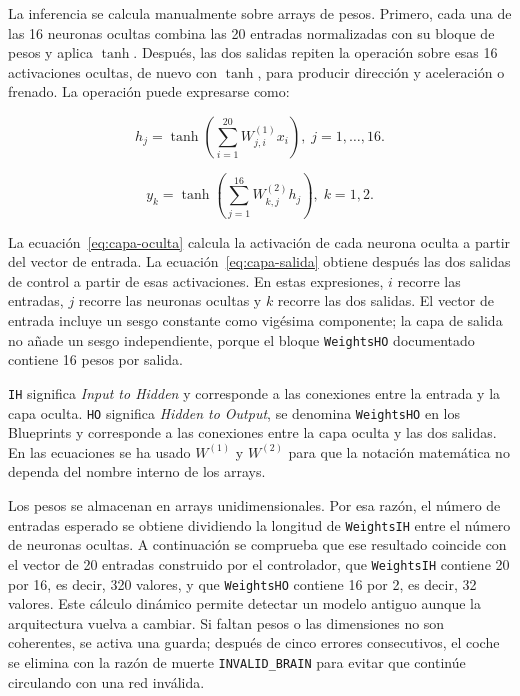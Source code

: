 La inferencia se calcula manualmente sobre arrays de pesos. Primero, cada una de las 16 neuronas ocultas combina las 20 entradas normalizadas con su bloque de pesos y aplica \(\tanh\). Después, las dos salidas repiten la operación sobre esas 16 activaciones ocultas, de nuevo con \(\tanh\), para producir dirección y aceleración o frenado. La operación puede expresarse como:

\begin{equation}
\label{eq:capa-oculta}
h_j = \tanh\left(\sum_{i=1}^{20} W^{(1)}_{j,i} x_i\right),\; j=1,\ldots,16.
\end{equation}

\begin{equation}
\label{eq:capa-salida}
y_k = \tanh\left(\sum_{j=1}^{16} W^{(2)}_{k,j} h_j\right),\; k=1,2.
\end{equation}

La ecuación~\ref{eq:capa-oculta} calcula la activación de cada neurona oculta a partir del vector de entrada. La ecuación~\ref{eq:capa-salida} obtiene después las dos salidas de control a partir de esas activaciones. En estas expresiones, \(i\) recorre las entradas, \(j\) recorre las neuronas ocultas y \(k\) recorre las dos salidas. El vector de entrada incluye un sesgo constante como vigésima componente; la capa de salida no añade un sesgo independiente, porque el bloque \texttt{WeightsHO} documentado contiene 16 pesos por salida.

\texttt{IH} significa \textit{Input to Hidden} y corresponde a las conexiones entre la entrada y la capa oculta. \texttt{HO} significa \textit{Hidden to Output}, se denomina \texttt{WeightsHO} en los Blueprints y corresponde a las conexiones entre la capa oculta y las dos salidas. En las ecuaciones se ha usado \(W^{(1)}\) y \(W^{(2)}\) para que la notación matemática no dependa del nombre interno de los arrays.

Los pesos se almacenan en arrays unidimensionales. Por esa razón, el número de entradas esperado se obtiene dividiendo la longitud de \texttt{WeightsIH} entre el número de neuronas ocultas. A continuación se comprueba que ese resultado coincide con el vector de 20 entradas construido por el controlador, que \texttt{WeightsIH} contiene 20 por 16, es decir, 320 valores, y que \texttt{WeightsHO} contiene 16 por 2, es decir, 32 valores. Este cálculo dinámico permite detectar un modelo antiguo aunque la arquitectura vuelva a cambiar. Si faltan pesos o las dimensiones no son coherentes, se activa una guarda; después de cinco errores consecutivos, el coche se elimina con la razón de muerte \texttt{INVALID\_BRAIN} para evitar que continúe circulando con una red inválida.

